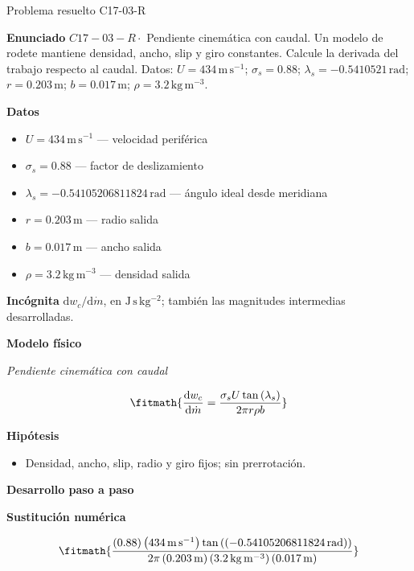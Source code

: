 \documentclass[10pt,openany]{book}
\begin{document}
\begin{studiumworked}{Problema resuelto C17-03-R}


\noindent\textbf{Enunciado}
\(C17-03-R \cdot\) Pendiente cinemática con caudal. Un modelo de rodete mantiene densidad, ancho, slip y giro constantes. Calcule la derivada del trabajo respecto al caudal. Datos: \(U=434\, \mathrm{m}\,\mathrm{s}^{-1}\); \(\sigma_s=0.88\); \(\lambda_s=-0.5410521\, \mathrm{rad}\); \(r=0.203\, \mathrm{m}\); \(b=0.017\, \mathrm{m}\); \(\rho=3.2\, \mathrm{kg}\,\mathrm{m}^{-3}\).

\noindent\textbf{Datos}
\begin{itemize}
\item $U = 434\,\mathrm{m}\,\mathrm{s}^{-1}$ — velocidad periférica
\item $\sigma_s = 0.88$ — factor de deslizamiento
\item $\lambda_s = -0.54105206811824\,\mathrm{rad}$ — ángulo ideal desde meridiana
\item $r = 0.203\,\mathrm{m}$ — radio salida
\item $b = 0.017\,\mathrm{m}$ — ancho salida
\item $\rho = 3.2\,\mathrm{kg}\,\mathrm{m}^{-3}$ — densidad salida
\end{itemize}

\noindent\textbf{Incógnita}
$\mathrm{d}w_c/\mathrm{d}\dot{m}$, en $\mathrm{J\,s\,kg^{-2}}$; también las magnitudes intermedias desarrolladas.

\noindent\textbf{Modelo físico}

\noindent\textit{Pendiente cinemática con caudal}

\[
\fitmath{\frac{\mathrm{d}w_c}{\mathrm{d}\dot{m}}=\frac{\sigma_s U \tan{\left(\lambda_s \right)}}{2 \pi r \rho b}}
\]

\noindent\textbf{Hipótesis}
\begin{itemize}
\item Densidad, ancho, slip, radio y giro fijos; sin prerrotación.
\end{itemize}

\noindent\textbf{Desarrollo paso a paso}



\noindent\textbf{Sustitución numérica}

\[
\fitmath{\frac{\left(0.88\right) \left(434\,\mathrm{m}\,\mathrm{s}^{-1}\right) \tan{\left(\left(-0.54105206811824\,\mathrm{rad}\right) \right)}}{2 \pi \left(0.203\,\mathrm{m}\right) \left(3.2\,\mathrm{kg}\,\mathrm{m}^{-3}\right) \left(0.017\,\mathrm{m}\right)}}
\]


\end{studiumworked}
\end{document}
